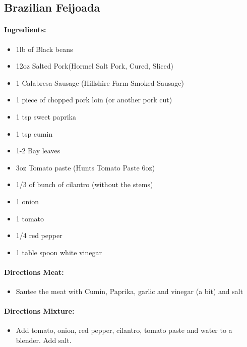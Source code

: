 \documentclass{article}
\begin{document}
\subsection{Brazilian Feijoada}

\paragraph{Ingredients:}

\begin{itemize}
	\item 1lb of Black beans 
	\item 12oz Salted Pork(Hormel Salt Pork, Cured, Sliced)
	\item 1 Calabresa Sausage (Hillshire Farm Smoked Sausage)
	\item 1 piece of chopped pork loin (or another pork cut)
	\item 1 tsp sweet paprika
	\item 1 tsp cumin
	\item 1-2 Bay leaves 
	\item 3oz Tomato paste (Hunts Tomato Paste 6oz)
	\item 1/3 of bunch of cilantro (without the stems)
	\item 1 onion 
	\item 1 tomato 
	\item 1/4 red pepper 
	\item 1 table spoon white vinegar
\end{itemize}

\paragraph{Directions Meat:}
\begin{itemize}
	\item Sautee the meat with Cumin, Paprika, garlic and vinegar (a bit) and salt
\end{itemize}

\paragraph{Directions Mixture:}
\begin{itemize}
	\item Add tomato, onion, red pepper, cilantro, tomato paste and water to a blender. Add salt.
\end{itemize}
\end{document}
